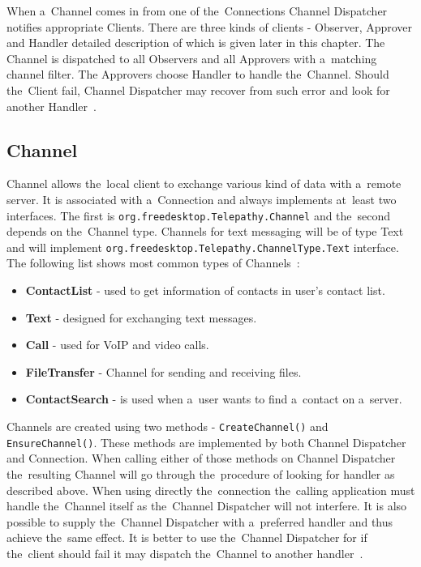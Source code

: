 When a~Channel comes in from one of the~Connections Channel Dispatcher notifies appropriate Clients. There are three kinds of clients - Observer, Approver and Handler detailed description of which is given later in this chapter. The Channel is dispatched to all Observers and all Approvers with a~matching channel filter. The Approvers choose Handler to handle the~Channel. Should the~Client fail, Channel Dispatcher may recover from such error and look for another Handler~\cite{TPWiki}.


\subsection*{Channel}
Channel allows the~local client to exchange various kind of data with a~remote server. It is associated with a~Connection and always implements at~least two interfaces. The first is \verb|org.freedesktop.Telepathy.Channel| and the~second depends on the~Channel type. Channels for text messaging will be of type Text and will implement \newline \verb|org.freedesktop.Telepathy.ChannelType.Text| interface. The following list shows most common types of Channels~\cite{TPWiki}:

\begin{itemize}

	\item {\bf ContactList} - used to get information of contacts in user's contact list.

	\item {\bf Text} - designed for exchanging text messages. 

	\item {\bf Call} - used for VoIP and video calls. 

	\item {\bf FileTransfer} - Channel for sending and receiving files.

	\item {\bf ContactSearch} - is used when a~user wants to find a~contact on a~server.

\end{itemize}

Channels are created using two methods - \verb|CreateChannel()| and \verb|EnsureChannel()|. These methods are implemented by both Channel Dispatcher and Connection. When calling either of those methods on Channel Dispatcher the~resulting Channel will go through the~procedure of looking for handler as described above. When using directly the~connection the~calling application must handle the~Channel itself as the~Channel Dispatcher will not interfere. It is also possible to supply the~Channel Dispatcher with a~preferred handler and thus achieve the~same effect. It is better to use the~Channel Dispatcher for if the~client should fail it may dispatch the~Channel to another handler~\cite{TPWiki}.

